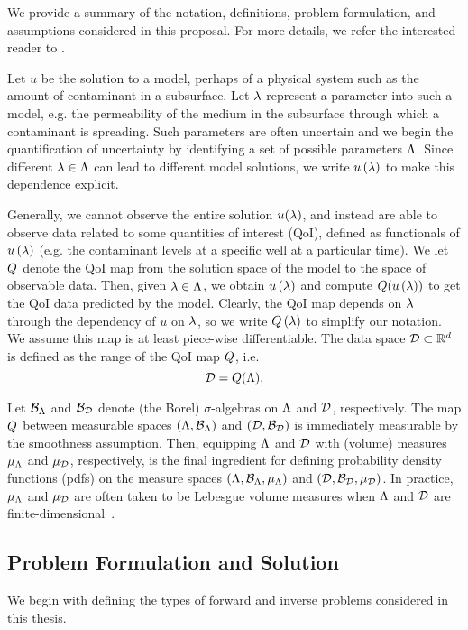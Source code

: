 We provide a summary of the notation, definitions, problem-formulation, and assumptions considered in this proposal. 
For more details,  we refer the interested reader to \cite{BES12, BE13, BET+14}. 

Let $u$ be the solution to a model, perhaps of a physical system such as the amount of contaminant in a subsurface. 
Let $\lambda$ represent a parameter into such a model, e.g. the permeability of the medium in the subsurface through which a contaminant is spreading.
Such parameters are often uncertain and we begin the quantification of uncertainty by identifying a set of possible parameters ${\Lambda}$.
Since different $\lambda \in {\Lambda}$ can lead to different model solutions, we write $u\left ( \lambda \right )$ to make this dependence explicit.

Generally, we cannot observe the entire solution $u(\lambda)$, and instead are able to observe data related to some quantities of interest (QoI), defined as functionals of $u\left ( \lambda \right )$ (e.g. the contaminant levels at a specific well at a particular time).
We let $Q$ denote the QoI map from the solution space of the model to the space of observable data. 
Then, given $\lambda \in {\Lambda}$, we obtain $u\left ( \lambda \right )$ and compute $Q(u\left ( \lambda \right ))$ to get the QoI data predicted by the model.
Clearly, the QoI map depends on $\lambda$ through the dependency of $u$ on $\lambda$, so we write $Q\left ( \lambda \right )$ to simplify our notation.
We assume this map is at least piece-wise differentiable.	
The data space $\mathcal{D} \subset \mathbb{R}^d$ is defined as the range of the QoI map $Q$, i.e. 
\[
\mathcal{D} = Q({\Lambda}).
\]

Let $\mathcal{B}_{{\Lambda}}$ and $\mathcal{B}_{\mathcal{D}}$ denote (the Borel) $\sigma$-algebras on ${\Lambda}$ and $\mathcal{D}$, respectively.
The map $Q$ between measurable spaces $({\Lambda}, \mathcal{B}_{{\Lambda}})$ and $(\mathcal{D}, \mathcal{B}_{\mathcal{D}})$ is immediately measurable by the smoothness assumption. 
Then, equipping ${\Lambda}$ and $\mathcal{D}$ with (volume) measures $\mu_{{\Lambda}}$ and $\mu_{\mathcal{D}}$, respectively, is the final ingredient for defining probability density functions (pdfs) on the measure spaces $({\Lambda}, \mathcal{B}_{{\Lambda}}, \mu_{{\Lambda}})$ and $(\mathcal{D}, \mathcal{B}_{\mathcal{D}}, \mu_{\mathcal{D}})$.
In practice, $\mu_{{\Lambda}}$ and $\mu_{\mathcal{D}}$ are often taken to be Lebesgue volume measures when ${\Lambda}$ and $\mathcal{D}$ are finite-dimensional~\cite{BET+14, BJW18}.


\subsection{Problem Formulation and Solution}
We begin with defining the types of forward and inverse problems considered in this thesis.

